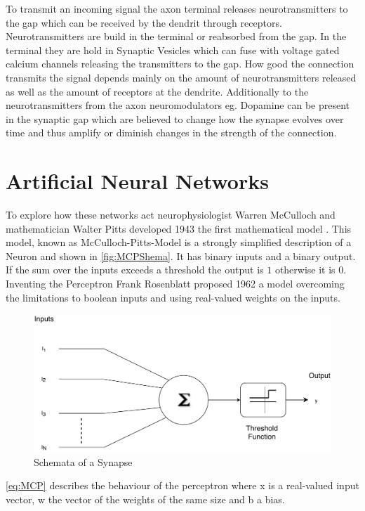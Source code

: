 To transmit an incoming signal the axon terminal releases neurotransmitters to the gap which can be received by the dendrit through receptors. Neurotransmitters are build in the terminal or reabsorbed from the gap. In the terminal they are hold in Synaptic Vesicles which can fuse with voltage gated calcium channels releasing the transmitters to the gap\cite{Catterall411}. How good the connection transmits the signal depends mainly on the amount of neurotransmitters released as well as the amount of receptors at the dendrite. Additionally to the neurotransmitters from the axon neuromodulators eg. Dopamine can be present in the synaptic gap which are believed to change how the synapse evolves over time and thus amplify or diminish changes in the strength of the connection.

\section{Artificial Neural Networks}
To explore how these networks act neurophysiologist Warren McCulloch and mathematician Walter Pitts developed 1943 the first mathematical model \cite{mcculloch1943logical}. This model, known as McCulloch-Pitts-Model is a strongly simplified description of a Neuron and shown in \autoref{fig:MCPShema}. It has binary inputs and a binary output. If the sum over the  inputs exceeds a threshold the output is $1$ otherwise it is $0$. Inventing the Perceptron Frank Rosenblatt proposed 1962 a model overcoming the limitations to boolean inputs and using real-valued weights on the inputs.
\begin{figure}[htpb]
  \centering
  \includegraphics[scale=0.65]{figures/McPSchema.pdf}
  \caption[Schemata of McCulloch-Pitts-Model]{Schemata of a Synapse \cite{wikiSyn}}
  \label{fig:MCPShema}
\end{figure}
\newline
\autoref{eq:MCP} describes the behaviour of the perceptron where x is a real-valued input vector, w the vector of the weights of the same size and b a bias. 
\newline

